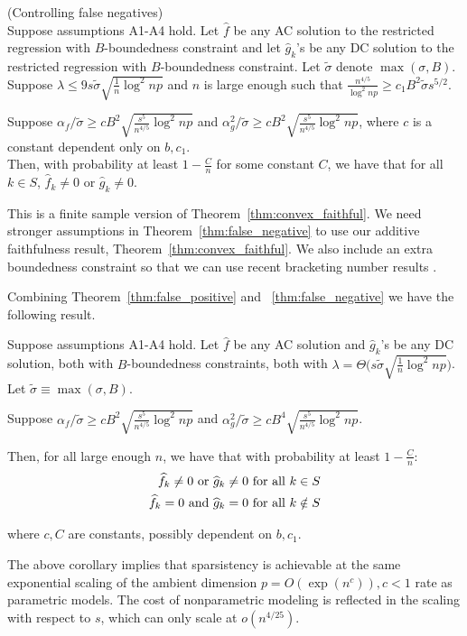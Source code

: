 \begin{theorem} (Controlling false negatives) \\
\label{thm:false_negative}
Suppose assumptions A1-A4 hold. Let $\hat{f}$ be any AC solution to the restricted regression with $B$-boundedness constraint and let $\hat{g}_k$'s be any DC solution to the restricted regression with $B$-boundedness constraint. Let $\tilde{\sigma}$ denote $\max(\sigma, B)$.\\

Suppose $\lambda \leq 9 s \tilde{\sigma} \sqrt{\frac{1}{n} \log^2 np}$ and $n$ is large enough such that $\frac{n^{4/5}}{\log^2 np} \geq c_1 B^2 \tilde{\sigma} s^{5/2}$. 

Suppose 
$\alpha_f/\tilde{\sigma} \geq c B^2 \sqrt{\frac{s^5}{n^{4/5}} \log^2 np}$ and $\alpha_g^2/\tilde{\sigma} \geq c B^2 \sqrt{\frac{s^5}{n^{4/5}} \log^2 np}$, where $c$ is a constant dependent only on $b, c_1$.\\

Then, with probability at least $1 - \frac{C}{n}$ for some constant $C$, we have that for all $k \in S$, $\hat{f}_k \neq 0$ or $\hat{g}_k \neq 0$. 

\end{theorem}

This is a finite sample version of
Theorem~\ref{thm:convex_faithful}. We need stronger assumptions in
Theorem~\ref{thm:false_negative} to use our additive faithfulness
result, Theorem~\ref{thm:convex_faithful}. We also include an extra
boundedness constraint so that we can use recent bracketing number
results \cite{kim2014global}.

Combining Theorem~\ref{thm:false_positive} and
~\ref{thm:false_negative} 
we have the following result.
\begin{corollary}
Suppose assumptions A1-A4 hold. Let $\hat{f}$ be any AC solution and $\hat{g}_k$'s be any DC solution, both with $B$-boundedness constraints, both with 
$\lambda = \Theta\big( s \tilde{\sigma} \sqrt{\frac{1}{n} \log^2 np} \big) $. Let $\tilde{\sigma} \equiv \max(\sigma, B)$.


Suppose 
$\alpha_f/\tilde{\sigma} \geq c B^2 \sqrt{\frac{s^5}{n^{4/5}} \log^2 np}$ and $\alpha_g^2/\tilde{\sigma} \geq c B^4 \sqrt{\frac{s^5}{n^{4/5}} \log^2 np}$.

Then, for all large enough $n$, we have that with probability at least $1-\frac{C}{n}$:
\begin{align*}
\widehat{f}_k \neq 0 \textrm{ or } \widehat{g}_k \neq 0 &\textrm{ for all } k \in S\\
\widehat{f}_k = 0 \textrm{ and } \widehat{g}_k = 0 & \textrm{ for all } k \notin S
\end{align*}

where $c,C$ are constants, possibly dependent on $b, c_1$.

\end{corollary}
The above corollary implies that sparsistency is achievable at the same exponential scaling of the ambient dimension $p = O(\exp(n^c)), c<1$ rate as parametric models. The cost of nonparametric modeling is reflected in the scaling with respect to $s$, which can only scale at $o(n^{4/25})$.

